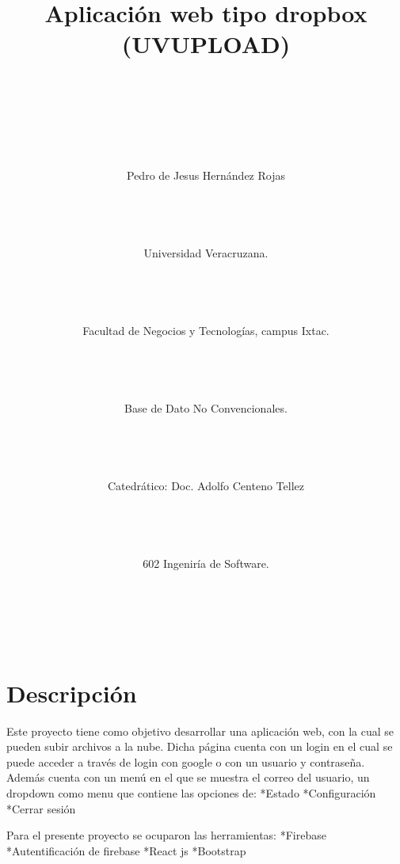 \documentclass[10pt]{article} %
\title{Aplicación web tipo dropbox (UVUPLOAD) \\ \\ \\ \\}
\author{Pedro de Jesus Hernández Rojas  \\ \\ \\ \\ \\ Universidad Veracruzana.  \\ \\ \\ \\ \\ Facultad de Negocios y Tecnologías, campus Ixtac.  \\ \\ \\ \\ \\ Base de Dato No Convencionales. \\ \\ \\ \\ \\Catedrático: Doc. Adolfo Centeno Tellez \\ \\ \\ \\ \\
602 Ingeniría de Software. \\ \\ \\ \\ \\ }
\begin{document}
 
\maketitle


 
 
 


\section{Descripción}


Este proyecto tiene como objetivo desarrollar una aplicación web, con la cual se pueden subir archivos a la nube. Dicha página cuenta con un login en el cual se puede acceder a través de login con google o con un usuario y contraseña. 
Además cuenta con un menú en el que se muestra el correo del usuario, un dropdown como menu que contiene las opciones de:
*Estado 
*Configuración
*Cerrar sesión

Para el presente proyecto se ocuparon las herramientas:
*Firebase
*Autentificación de firebase
*React js
*Bootstrap



 

 

 
\end{document}
